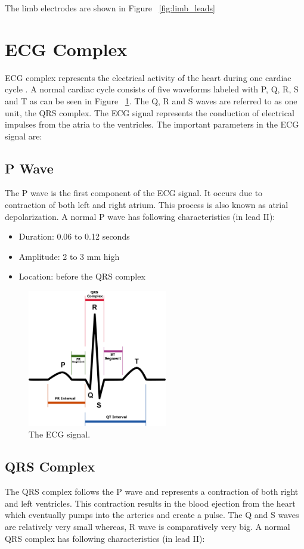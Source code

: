 The limb electrodes are shown in Figure ~\ref{fig:limb_leads}


\section{ECG Complex}
ECG complex represents the electrical activity of the heart during one cardiac cycle \cite{wilkins2005ecg}. A normal cardiac cycle consists of five waveforms labeled with P, Q, R, S and T as can be seen in Figure ~\ref{fig:SinusRhythmLabels}. The Q, R and S waves are referred to as one unit, the QRS complex. The ECG signal represents the conduction of electrical impulses from the atria to the ventricles. The important parameters in the ECG signal are:

\subsection{P Wave}

The P wave is the first component of the ECG signal. It occurs due to contraction of both left and right atrium. This process is also known as atrial depolarization. A normal P wave has following characteristics (in lead II):
\begin{itemize}
	\item Duration: 0.06 to 0.12 seconds
	\item Amplitude: 2 to 3 mm high
	\item Location: before the QRS complex
\end{itemize}

\begin{figure}[htpb]
	\centering
	\includegraphics[width=\textwidth,height=6cm,keepaspectratio=true]{images/SinusRhythmLabels}
	\caption{
		The ECG signal\cite{wiki:SinusRhythmLabels}.
	}
	\label{fig:SinusRhythmLabels}
\end{figure}

\subsection{QRS Complex}
The QRS complex follows the P wave and represents a contraction of both right and left ventricles. This contraction results in the blood ejection from the heart which eventually pumps into the arteries and create a pulse. The Q and S waves are relatively very small whereas, R wave is comparatively very big. A normal QRS complex has following characteristics (in lead II):

